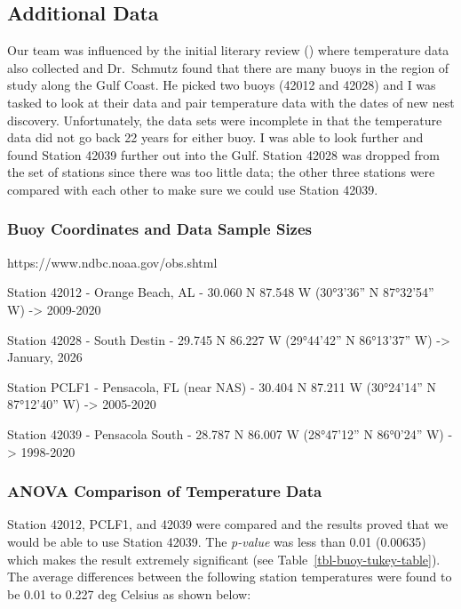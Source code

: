 \documentclass[
  letterpaper,
  DIV=11,
  numbers=noendperiod]{scrartcl}
\begin{document}
\subsection{Additional Data}\label{additional-data}

Our team was influenced by the initial literary review
() where temperature data also
collected and Dr.~Schmutz found that there are many buoys in the region
of study along the Gulf Coast. He picked two buoys (42012 and 42028) and
I was tasked to look at their data and pair temperature data with the
dates of new nest discovery. Unfortunately, the data sets were
incomplete in that the temperature data did not go back 22 years for
either buoy. I was able to look further and found Station 42039 further
out into the Gulf. Station 42028 was dropped from the set of stations
since there was too little data; the other three stations were compared
with each other to make sure we could use Station 42039.

\subsubsection{Buoy Coordinates and Data Sample
Sizes}\label{buoy-coordinates-and-data-sample-sizes}

https://www.ndbc.noaa.gov/obs.shtml

Station 42012 - Orange Beach, AL - 30.060 N 87.548 W (30°3'36'' N
87°32'54'' W) -\textgreater{} 2009-2020

Station 42028 - South Destin - 29.745 N 86.227 W (29°44'42'' N
86°13'37'' W) -\textgreater{} January, 2026

Station PCLF1 - Pensacola, FL (near NAS) - 30.404 N 87.211 W (30°24'14''
N 87°12'40'' W) -\textgreater{} 2005-2020

Station 42039 - Pensacola South - 28.787 N 86.007 W (28°47'12'' N
86°0'24'' W) -\textgreater{} 1998-2020

\subsubsection{ANOVA Comparison of Temperature
Data}\label{anova-comparison-of-temperature-data}

Station 42012, PCLF1, and 42039 were compared and the results proved
that we would be able to use Station 42039. The \emph{p-value} was less
than 0.01 (0.00635) which makes the result extremely significant (see
Table~\ref{tbl-buoy-tukey-table}). The average differences between the
following station temperatures were found to be 0.01 to 0.227 deg
Celsius as shown below:
\end{document}
